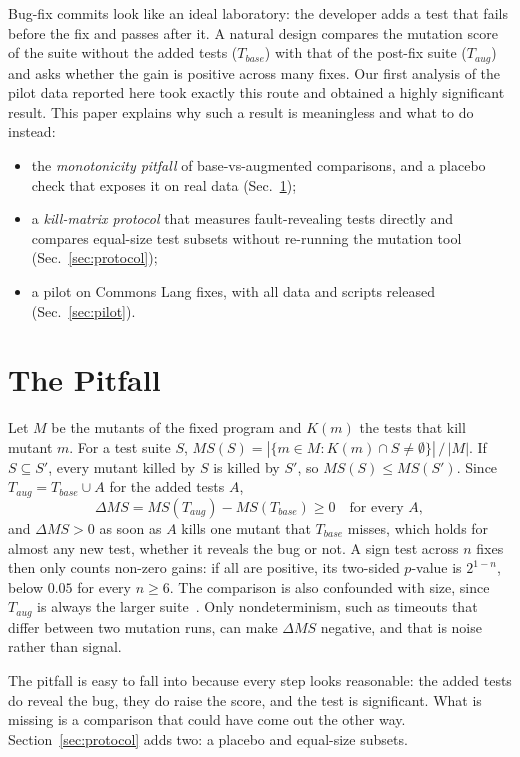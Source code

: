 \documentclass[conference]{IEEEtran}
\newcommand{\MS}{\mathit{MS}}
\newcommand{\Tbase}{T_{\mathit{base}}}
\newcommand{\Taug}{T_{\mathit{aug}}}
\begin{document}
Bug-fix commits look like an ideal laboratory: the developer adds a test that fails before the fix and
passes after it. A natural design compares the mutation score of the suite without the added tests
($\Tbase$) with that of the post-fix suite ($\Taug$) and asks whether the gain is positive across many
fixes. Our first analysis of the pilot data reported here took exactly this route and obtained a highly
significant result. This paper explains why such a result is meaningless and what to do instead:
\begin{itemize}
\item the \emph{monotonicity pitfall} of base-vs-augmented comparisons, and a placebo check that exposes it
on real data (Sec.~\ref{sec:pitfall});
\item a \emph{kill-matrix protocol} that measures fault-revealing tests directly and compares equal-size test
subsets without re-running the mutation tool (Sec.~\ref{sec:protocol});
\item a pilot on \PitfallPairs{} Commons Lang fixes, with all data and scripts released
(Sec.~\ref{sec:pilot}).
\end{itemize}

\section{The Pitfall}\label{sec:pitfall}
Let $M$ be the mutants of the fixed program and $K(m)$ the tests that kill mutant $m$. For a test suite $S$,
$\MS(S) = |\{m \in M : K(m) \cap S \neq \emptyset\}|\,/\,|M|$. If $S \subseteq S'$, every mutant killed by $S$
is killed by $S'$, so $\MS(S) \le \MS(S')$. Since $\Taug = \Tbase \cup A$ for the added tests $A$,
\begin{equation}
\Delta\MS = \MS(\Taug) - \MS(\Tbase) \ge 0 \quad \text{for every } A,
\end{equation}
and $\Delta\MS > 0$ as soon as $A$ kills one mutant that $\Tbase$ misses, which holds for almost any new
test, whether it reveals the bug or not. A sign test across $n$ fixes then only counts non-zero gains: if all
are positive, its two-sided $p$-value is $2^{1-n}$, below $0.05$ for every $n \ge 6$. The comparison is also
confounded with size, since $\Taug$ is always the larger suite~\cite{papadakis2018mutation}. Only
nondeterminism, such as timeouts that differ between two mutation runs, can make $\Delta\MS$ negative, and
that is noise rather than signal.

The pitfall is easy to fall into because every step looks reasonable: the added tests do reveal the bug,
they do raise the score, and the test is significant. What is missing is a comparison that could have come
out the other way. Section~\ref{sec:protocol} adds two: a placebo and equal-size subsets.
\end{document}
